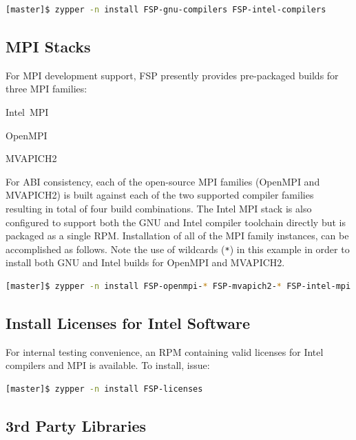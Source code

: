 \documentclass[letterpaper]{article}
\begin{document}
\begin{lstlisting}[language=bash]
[master]$ zypper -n install FSP-gnu-compilers FSP-intel-compilers
\end{lstlisting}

\subsection{MPI Stacks} \label{sec:mpi}

For MPI development support, FSP presently provides pre-packaged builds for
three MPI families: 

\begin{itemize*}
\item Intel~MPI
\item OpenMPI
\item MVAPICH2
\end{itemize*}
 For ABI consistency, each of the open-source MPI families (OpenMPI and
 MVAPICH2) is built against each of the two supported compiler families
 resulting in total of four build combinations.  The Intel MPI stack is also 
 configured to support both the GNU and Intel compiler toolchain directly but
 is packaged as a single RPM. Installation of all of the MPI family instances,
 can be accomplished as follows. Note the use of wildcards (\texttt{*}) in this
 example in order to install both GNU and Intel builds for OpenMPI and
 MVAPICH2.

\begin{lstlisting}[language=bash]
[master]$ zypper -n install FSP-openmpi-* FSP-mvapich2-* FSP-intel-mpi
\end{lstlisting}

\subsection{Install Licenses for Intel Software}

For internal testing convenience, an RPM containing valid licenses for Intel
compilers and MPI is available. To install, issue:

\begin{lstlisting}[language=bash,keywords={},upquote=true]
[master]$ zypper -n install FSP-licenses
\end{lstlisting}

\subsection{3rd Party Libraries}
\end{document}
